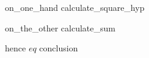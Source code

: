 {on_one_hand}
{calculate_square_hyp}

{on_the_other}
{calculate_sum}

{hence} ${eq}$ \newline
{conclusion}
